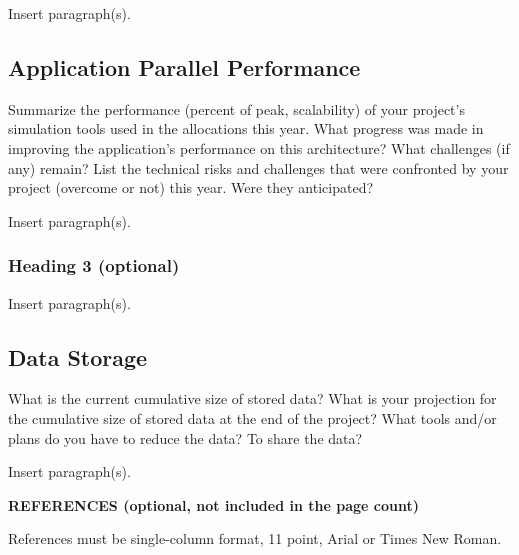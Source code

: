 \documentclass[11pt,letterpaper,english]{article}
\begin{document}
Insert paragraph(s).

\subsection{Application Parallel Performance} 

Summarize the performance (percent of peak, scalability) of your project's simulation tools used in the allocations this year. What progress was made in improving the application's performance on this architecture? What challenges (if any) remain? List the technical risks and challenges that were confronted by your project (overcome or not) this year. Were they anticipated?

Insert paragraph(s).


\subsubsection{Heading 3 (optional)}

Insert paragraph(s).


\subsection{Data Storage} 

What is the current cumulative size of stored data? What is your projection for the cumulative size of stored data at the end of the project? What tools and/or plans do you have to reduce the data? To share the data?

Insert paragraph(s).


\vspace{.08in}
\textbf{REFERENCES (optional, not included in the page count)}
\vspace{6pt}

References must be single-column format, 11 point, Arial or Times New Roman.



\end{document}
